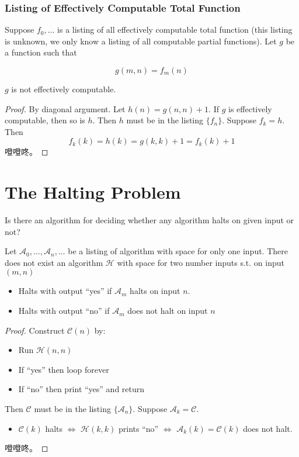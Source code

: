 \subsubsection{Listing of Effectively Computable Total Function}

Suppose $f_0,\dots$ is a listing of all effectively computable total function (this listing is unknown, we only know a listing of all computable partial functions). Let $g$ be a function such that

\[ g(m,n) = f_m(n) \]

$g$ is not effectively computable.

\begin{proof}
    By diagonal argument. Let $h(n) = g(n,n) + 1$. If $g$ is effectively computable, then so is $h$. Then $h$ must be in the listing $\{f_n\}$. Suppose $f_k = h$. Then
    \[ f_k(k) = h(k) = g(k,k)+1 = f_k(k) + 1 \]
    噔噔咚。
\end{proof}

\section{The Halting Problem}

Is there an algorithm for deciding whether any algorithm halts on given input or not?

\begin{theorem}
    \label{thm:HaltingProblem}
    Let $\mathcal{A}_0,\dots,\mathcal{A}_n,\dots$ be a listing of algorithm with space for only one input. There does not exist an algorithm $\mathcal{H}$ with space for two number inputs s.t. on input $(m,n)$
    \begin{itemize}
        \item Halts with output ``yes'' if $\mathcal{A}_m$ halts on input $n$.
        \item Halts with output ``no'' if $\mathcal{A}_m$ does not halt on input $n$
    \end{itemize}
\end{theorem}
\begin{proof}
    Construct $\mathcal{C}(n)$ by:
    \begin{itemize}
        \item Run $\mathcal{H}(n,n)$
        \item If ``yes'' then loop forever
        \item If ``no'' then print ``yes'' and return
    \end{itemize}

    Then $\mathcal{C}$ must be in the listing $\{\mathcal{A}_n\}$. Suppose $\mathcal{A}_k = \mathcal{C}$.
    \begin{itemize}
        \item $\mathcal{C}(k)$ halts $\Leftrightarrow$ $\mathcal{H}(k,k)$ prints ``no'' $\Leftrightarrow$ $\mathcal{A}_k(k) = \mathcal{C}(k)$ does not halt.
    \end{itemize}
    噔噔咚。
\end{proof}